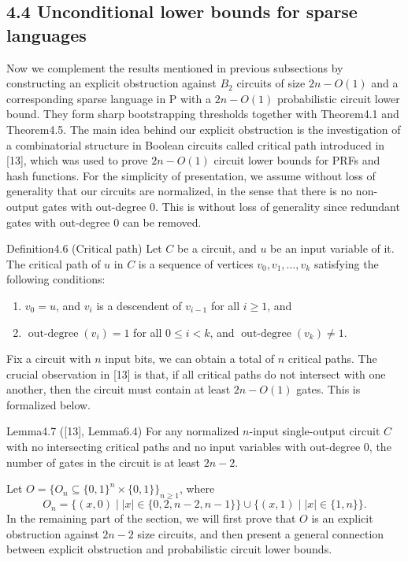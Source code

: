 \subsection*{4.4 Unconditional lower bounds for sparse languages}
Now we complement the results mentioned in previous subsections by constructing an explicit obstruction against $B_2$ circuits of size $2n-O(1)$ and a corresponding sparse language in P with a $2n-O(1)$ probabilistic circuit lower bound. They form sharp bootstrapping thresholds together with Theorem4.1 and Theorem4.5.
The main idea behind our explicit obstruction is the investigation of a combinatorial structure in Boolean circuits called critical path introduced in [13], which was used to prove $2n-O(1)$ circuit lower bounds for PRFs and hash functions.
For the simplicity of presentation, we assume without loss of generality that our circuits are normalized, in the sense that there is no non-output gates with out-degree 0. This is without loss of generality since redundant gates with out-degree 0 can be removed.
\begin{authorclaim}{Definition4.6 (Critical path)}
Let $C$ be a circuit, and $u$ be an input variable of it. The critical path of $u$ in $C$ is a sequence of vertices $v_0,v_1,\ldots,v_k$ satisfying the following conditions:
\begin{enumerate}
\item $v_0=u$, and $v_i$ is a descendent of $v_{i-1}$ for all $i\ge1$, and
\item $\operatorname{out\text{-}degree}(v_i)=1$ for all $0\le i<k$, and $\operatorname{out\text{-}degree}(v_k)\ne1$.
\end{enumerate}
\end{authorclaim}
Fix a circuit with $n$ input bits, we can obtain a total of $n$ critical paths. The crucial observation in [13] is that, if all critical paths do not intersect with one another, then the circuit must contain at least $2n-O(1)$ gates. This is formalized below.
\begin{authorclaim}{Lemma4.7 ([13], Lemma6.4)}
For any normalized $n$-input single-output circuit $C$ with no intersecting critical paths and no input variables with out-degree 0, the number of gates in the circuit is at least $2n-2$.
\end{authorclaim}
Let $O=\{O_n\subseteq\{0,1\}^n\times\{0,1\}\}_{n\ge1}$, where
\[O_n=\{(x,0)\mid|x|\in\{0,2,n-2,n-1\}\}\cup\{(x,1)\mid|x|\in\{1,n\}\}.\]
In the remaining part of the section, we will first prove that $O$ is an explicit obstruction against $2n-2$ size circuits, and then present a general connection between explicit obstruction and probabilistic circuit lower bounds.
